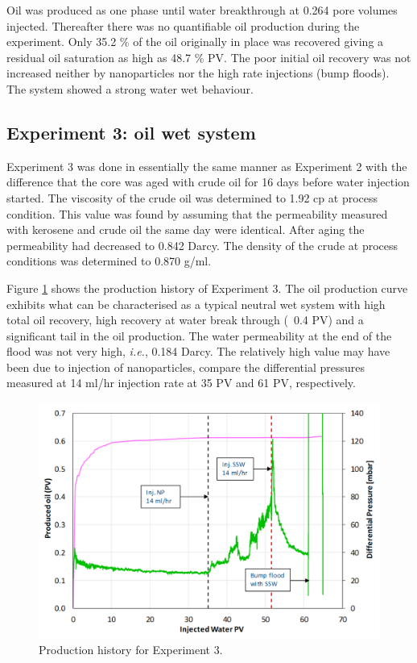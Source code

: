 Oil was produced as one phase until water breakthrough at 0.264 pore volumes injected. Thereafter there was no quantifiable oil production during the experiment. Only 35.2 \% of the oil originally in place was recovered giving a residual oil saturation as high as 
48.7 \% PV. The poor initial oil recovery was not increased neither by nanoparticles nor the high rate injections (bump floods). The system showed a strong water wet behaviour.

\subsection{Experiment 3: oil wet system}

Experiment 3 was done in essentially the same manner as Experiment 2 with the difference that the core was aged with crude oil for 16 days before water injection started. The viscosity of the crude oil was determined to 1.92 cp at process condition. This value was found by assuming that the permeability measured with kerosene and crude oil the same day were identical. After aging the permeability had decreased to 0.842 Darcy. The density of the crude at process conditions was determined to 0.870 g/ml.

Figure \ref{cht:prodexp3} shows the production history of Experiment 3. The oil production curve exhibits what can be characterised as a typical neutral wet system with high total oil recovery, high recovery at water break through (~0.4 PV) and a significant tail in the oil production. The water permeability at the end of the flood was not very high, \textit{i.e.}, 0.184 Darcy. The relatively high value may have been due to injection of nanoparticles, compare the differential pressures measured at 14 ml/hr injection rate at 35 PV and 61 PV, respectively.

\begin{figure}[h!]
    \centering
    \includegraphics[width=\textwidth]{img/cht/prodexp3.png}
    \caption{Production history for Experiment 3.}
    \label{cht:prodexp3} %
\end{figure}

